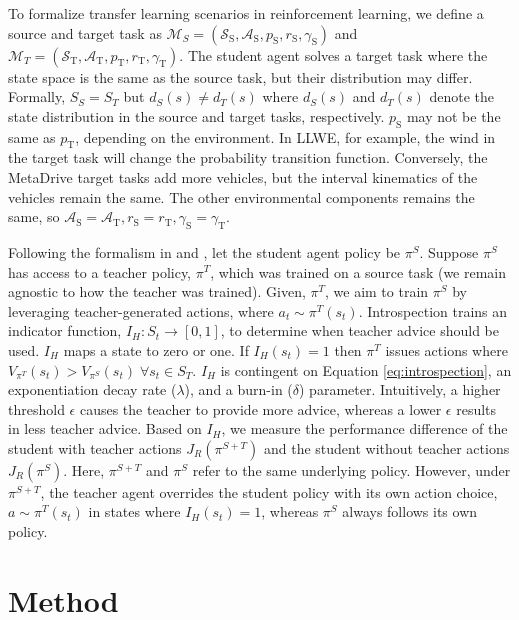 \documentclass{article} %
\begin{document}
To formalize transfer learning scenarios in reinforcement learning, we define a source and target task as $\mathcal{M}_S = (\mathcal{S}_\text{S}, \mathcal{A}_\text{S}, p_\text{S}, r_\text{S}, \gamma_\text{S})$ and $\mathcal{M}_T=(\mathcal{S}_\text{T}, \mathcal{A}_\text{T}, p_\text{T}, r_\text{T}, \gamma_\text{T})$. The student agent solves a target task where the state space is the same as the source task, but their distribution may differ. Formally, $S_S = S_T$ but $d_S(s)\neq d_T(s)$ where $d_S(s)$ and $d_T(s)$ denote the state distribution in the source and target tasks, respectively. $p_\text{S}$ may not be the same as $p_\text{T}$, depending on the environment. In LLWE, for example, the wind in the target task will change the probability transition function. Conversely, the MetaDrive target tasks add more vehicles, but the interval kinematics of the vehicles remain the same. The other environmental components remains the same, so $\mathcal{A}_\text{S} = \mathcal{A}_\text{T}, r_\text{S} = r_\text{T}, \gamma_\text{S} = \gamma_\text{T}$. 

Following the formalism in  \citet{campbell2023introspective} and \citet{sutton1998reinforcement}, let the student agent policy be $\pi^S$. Suppose $\pi^S$ has access to a teacher policy, $\pi^T$, which was trained on a source task (we remain agnostic to how the teacher was trained). Given, $\pi^T$, we aim to train $\pi^S$ by leveraging teacher-generated actions, where $a_t \sim \pi^T(s_t)$. Introspection trains an indicator function, $I_H:S_t\rightarrow[0,1]$, to determine when teacher advice should be used. $I_H$ maps a state to zero or one. If $I_H(s_t)=1$ then $\pi^T$ issues actions where $V_{\pi^T}(s_t) > V_{\pi^S}(s_t) \;\forall s_t \in S_T$. $I_H$ is contingent on Equation \ref{eq:introspection}, an exponentiation decay rate ($\lambda$), and a burn-in ($\delta$) parameter. Intuitively, a higher threshold $\epsilon$ causes the teacher to provide more advice, whereas a lower $\epsilon$ results in less teacher advice. Based on $I_H$, we measure the performance difference of the student with teacher actions $J_R(\pi^{S+T})$ and the student without teacher actions $J_R(\pi^S)$. Here, $\pi^{S+T}$ and $\pi^S$ refer to the same underlying policy. However, under $\pi^{S+T}$, the teacher agent overrides the student policy with its own action choice, $a\sim\pi^T(s_t)$ in states where $I_H(s_t)=1$, whereas $\pi^S$ always follows its own policy. 

\section{Method}
\label{sec:method}
\end{document}
